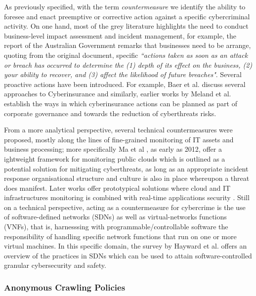 As previously specified, with the term \emph{countermeasure} we identify the ability to foresee and enact preemptive or corrective action against a specific cybercriminal activity. On one hand, most of the grey literature highlights the need to conduct business-level impact assessment and incident management, for example, the report of the Australian Government \cite{ring2017data} remarks that businesses need to be arrange, quoting from the original document, specific \emph{``actions taken as soon as an attack or breach has occurred to determine the (1) depth of its effect on the business, (2) your ability to recover, and (3) affect the likelihood of future breaches"}. Several proactive actions have been introduced. For example, Baer et al. discuss several approaches to Cyberinsurance \cite{BaerP07} and similarly, earlier works by Meland et al. \cite{MelandTS15} establish the ways in which cyberinsurance actions can be planned as part of corporate governance and towards the reduction of cyberthreats risks.

From a more analytical perspective, several technical countermeasures were proposed, mostly along the lines of fine-grained monitoring of IT assets and business processing; more specifically
Ma et al \cite{Ma2012}, as early as 2012, offer a ightweight framework for monitoring public clouds which is outlined as a potential solution for mitigating cyberthreats, as long as an appropriate incident response organisational structure and culture \cite{ChangL07,TangLZ16} is also in place whereupon a threat does manifest. Later works offer prototypical solutions where cloud and IT infrastructures monitoring is combined with real-time applications security \cite{CoppolinoDFR14}. Still on a technical perspective, acting as a countermeasure for cybercrime is the use of software-defined networks (SDNs) as well as virtual-networks functions (VNFs), that is, harnesssing with programmable/controllable software the responsibility of handling specific network functions that run on one or more virtual machines. In this specific domain, the survey by Hayward et al. \cite{scotthayward2013sec} offers an overview of the practices in SDNs which can be used to attain software-controlled granular cybersecurity and safety.

\subsubsection{Anonymous Crawling Policies}

